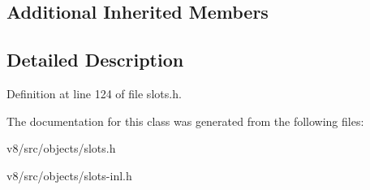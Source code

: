 \subsection*{Additional Inherited Members}


\subsection{Detailed Description}


Definition at line 124 of file slots.\+h.



The documentation for this class was generated from the following files\+:\begin{DoxyCompactItemize}
\item 
v8/src/objects/slots.\+h\item 
v8/src/objects/slots-\/inl.\+h\end{DoxyCompactItemize}

